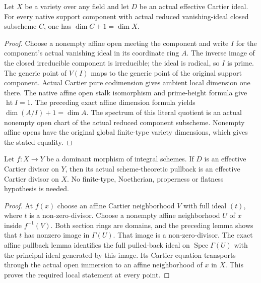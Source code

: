 \begin{lemma}
\label{lem:actual-cartier-component-dimension}
\leanok
Let $X$ be a variety over any field and let $D$ be an actual effective
Cartier ideal. For every native support component with actual reduced
vanishing-ideal closed subscheme $C$, one has $\dim C+1=\dim X$.
\end{lemma}
\begin{proof}
Choose a nonempty affine open meeting the component and write $I$ for
the component's actual vanishing ideal in its coordinate ring $A$.
The inverse image of the closed irreducible component is irreducible;
the ideal is radical, so $I$ is prime. The generic point of $V(I)$
maps to the generic point of the original support component. Actual
Cartier pure codimension gives ambient local dimension one there.
The native affine open stalk isomorphism and prime-height formula
give $\operatorname{ht}I=1$. The preceding exact affine dimension
formula yields $\dim(A/I)+1=\dim A$. The spectrum of this literal
quotient is an actual nonempty open chart of the actual reduced
component subscheme. Nonempty affine opens have the original global
finite-type variety dimensions, which gives the stated equality.
\end{proof}

\endgroup

\begingroup

\begin{theorem}
\label{thm:cartier-dominant-pullback}
\leanok
Let $f:X\to Y$ be a dominant morphism of integral schemes.
If $D$ is an effective Cartier divisor on $Y$, then its actual
scheme-theoretic pullback is an effective Cartier divisor on $X$.
No finite-type, Noetherian, properness or flatness hypothesis is needed.
\end{theorem}
\begin{proof}
At $f(x)$ choose an affine Cartier neighborhood $V$ with full ideal
$(t)$, where $t$ is a non-zero-divisor. Choose a nonempty affine
neighborhood $U$ of $x$ inside $f^{-1}(V)$. Both section rings are
domains, and the preceding lemma shows that $t$ has nonzero image
in $\Gamma(U)$. That image is a non-zero-divisor. The exact affine
pullback lemma identifies the full pulled-back ideal on
$\operatorname{Spec}\Gamma(U)$ with the principal ideal generated
by this image. Its Cartier equation transports through the actual
open immersion to an affine neighborhood of $x$ in $X$. This proves
the required local statement at every point.
\end{proof}

